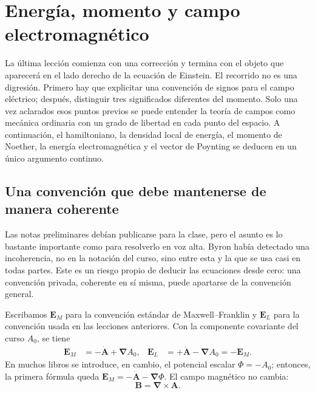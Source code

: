 \chapter{Energía, momento y campo electromagnético}

La última lección comienza con una corrección y termina con el objeto que aparecerá en el lado derecho de la ecuación de Einstein. El recorrido no es una digresión. Primero hay que explicitar una convención de signos para el campo eléctrico; después, distinguir tres significados diferentes del momento. Solo una vez aclarados esos puntos previos se puede entender la teoría de campos como mecánica ordinaria con un grado de libertad en cada punto del espacio. A continuación, el hamiltoniano, la densidad local de energía, el momento de Noether, la energía electromagnética y el vector de Poynting se deducen en un único argumento continuo.

\section{Una convención que debe mantenerse de manera coherente}

Las notas preliminares debían publicarse para la clase, pero el asunto es lo bastante importante como para resolverlo en voz alta. Byron había detectado una incoherencia, no en la notación del curso, sino entre esta y la que se usa casi en todas partes. Este es un riesgo propio de deducir las ecuaciones desde cero: una convención privada, coherente en sí misma, puede apartarse de la convención general.

Escribamos \(\mathbf E_M\) para la convención estándar de Maxwell--Franklin y \(\mathbf E_L\) para la convención usada en las lecciones anteriores. Con la componente covariante del curso \(A_0\), se tiene \begin{align}
\mathbf E_M
  &= -\dot{\mathbf A}+\boldsymbol{\nabla}A_0,
&
\mathbf E_L
  &= +\dot{\mathbf A}-\boldsymbol{\nabla}A_0
   =-\mathbf E_M .
\label{eq:two-electric-conventions}
\end{align}En muchos libros se introduce, en cambio, el potencial escalar \(\Phi=-A_0\); entonces, la primera fórmula queda \(\mathbf E_M=-\dot{\mathbf A}-\boldsymbol{\nabla}\Phi\). El campo magnético no cambia: \begin{equation}
\mathbf B=\boldsymbol{\nabla}\times\mathbf A.
\label{eq:B-from-A-opening}
\end{equation}

